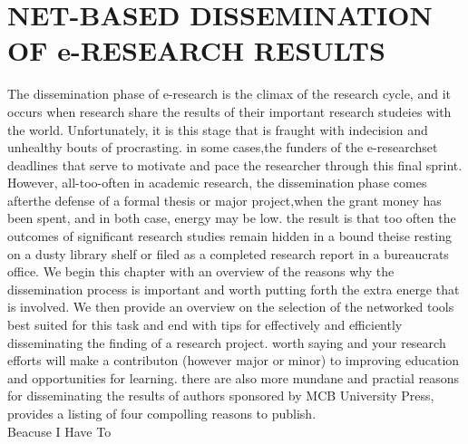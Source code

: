 \documentclass{book}
\begin{document}
\chapter{NET-BASED DISSEMINATION OF e-RESEARCH RESULTS}
The dissemination phase of e-research is the climax of the research cycle, and it occurs
when research share the results of their important research studeies with the world.
Unfortunately, it is this stage that is fraught with indecision and unhealthy bouts of
procrasting. in some cases,the funders of the e-researchset deadlines that serve to 
motivate and pace the researcher through this final sprint. However, all-too-often in
academic research, the dissemination phase comes afterthe defense of a formal thesis
or major project,when the grant money has been spent, and in both case, energy may
be low. the result is that too often the outcomes of significant research studies remain
hidden in a bound theise resting on a dusty library shelf or filed as a completed research
report in a bureaucrats office.
We begin this chapter with an overview of the reasons why the dissemination
process is important and worth putting forth the extra energe that is involved. We then 
provide an overview on the selection of the networked tools best suited for this task
and end with tips for effectively and efficiently disseminating the finding of a research project.
worth saying and your research efforts will make a contributon (however major or minor)
to improving education and opportunities for learning. there are also more 
mundane and practial reasons for disseminating the results of authors sponsored by 
MCB University Press, provides a listing of four compolling reasons to publish.\\

Beacuse I Have To\\
\end{document}
